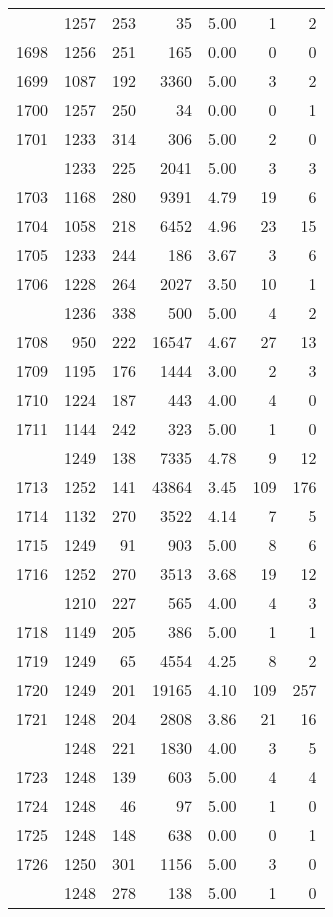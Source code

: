 \documentclass[
]{article}
\begin{document}
\begin{table}
\begin{tabular}[t]{lrrrrrr}
\addlinespace
1697 & 1257 & 253 & 35 & 5.00 & 1 & 2\\
1698 & 1256 & 251 & 165 & 0.00 & 0 & 0\\
1699 & 1087 & 192 & 3360 & 5.00 & 3 & 2\\
1700 & 1257 & 250 & 34 & 0.00 & 0 & 1\\
1701 & 1233 & 314 & 306 & 5.00 & 2 & 0\\
\addlinespace
1702 & 1233 & 225 & 2041 & 5.00 & 3 & 3\\
1703 & 1168 & 280 & 9391 & 4.79 & 19 & 6\\
1704 & 1058 & 218 & 6452 & 4.96 & 23 & 15\\
1705 & 1233 & 244 & 186 & 3.67 & 3 & 6\\
1706 & 1228 & 264 & 2027 & 3.50 & 10 & 1\\
\addlinespace
1707 & 1236 & 338 & 500 & 5.00 & 4 & 2\\
1708 & 950 & 222 & 16547 & 4.67 & 27 & 13\\
1709 & 1195 & 176 & 1444 & 3.00 & 2 & 3\\
1710 & 1224 & 187 & 443 & 4.00 & 4 & 0\\
1711 & 1144 & 242 & 323 & 5.00 & 1 & 0\\
\addlinespace
1712 & 1249 & 138 & 7335 & 4.78 & 9 & 12\\
1713 & 1252 & 141 & 43864 & 3.45 & 109 & 176\\
1714 & 1132 & 270 & 3522 & 4.14 & 7 & 5\\
1715 & 1249 & 91 & 903 & 5.00 & 8 & 6\\
1716 & 1252 & 270 & 3513 & 3.68 & 19 & 12\\
\addlinespace
1717 & 1210 & 227 & 565 & 4.00 & 4 & 3\\
1718 & 1149 & 205 & 386 & 5.00 & 1 & 1\\
1719 & 1249 & 65 & 4554 & 4.25 & 8 & 2\\
1720 & 1249 & 201 & 19165 & 4.10 & 109 & 257\\
1721 & 1248 & 204 & 2808 & 3.86 & 21 & 16\\
\addlinespace
1722 & 1248 & 221 & 1830 & 4.00 & 3 & 5\\
1723 & 1248 & 139 & 603 & 5.00 & 4 & 4\\
1724 & 1248 & 46 & 97 & 5.00 & 1 & 0\\
1725 & 1248 & 148 & 638 & 0.00 & 0 & 1\\
1726 & 1250 & 301 & 1156 & 5.00 & 3 & 0\\
\addlinespace
1727 & 1248 & 278 & 138 & 5.00 & 1 & 0\\

\end{tabular}
\end{table}
\end{document}
